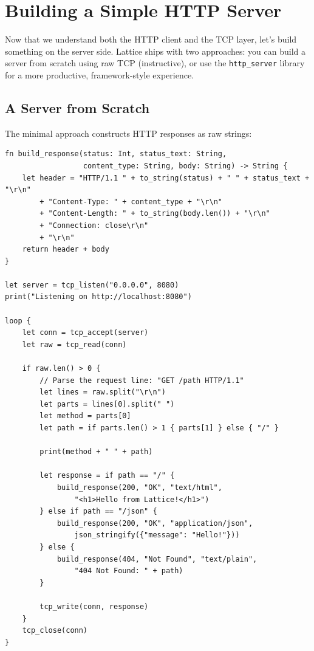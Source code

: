 \section{Building a Simple HTTP Server}\label{sec:http-server}


Now that we understand both the HTTP client and the TCP layer, let's build
something on the server side. Lattice ships with two approaches: you can
build a server from scratch using raw TCP (instructive), or use the
\texttt{http\_server} library for a more productive, framework-style
experience.

\subsection{A Server from Scratch}\label{sec:server-from-scratch}

The minimal approach constructs HTTP responses as raw strings:

\begin{lstlisting}[language=Lattice, caption={A minimal HTTP server from raw TCP}]
fn build_response(status: Int, status_text: String,
                  content_type: String, body: String) -> String {
    let header = "HTTP/1.1 " + to_string(status) + " " + status_text + "\r\n"
        + "Content-Type: " + content_type + "\r\n"
        + "Content-Length: " + to_string(body.len()) + "\r\n"
        + "Connection: close\r\n"
        + "\r\n"
    return header + body
}

let server = tcp_listen("0.0.0.0", 8080)
print("Listening on http://localhost:8080")

loop {
    let conn = tcp_accept(server)
    let raw = tcp_read(conn)

    if raw.len() > 0 {
        // Parse the request line: "GET /path HTTP/1.1"
        let lines = raw.split("\r\n")
        let parts = lines[0].split(" ")
        let method = parts[0]
        let path = if parts.len() > 1 { parts[1] } else { "/" }

        print(method + " " + path)

        let response = if path == "/" {
            build_response(200, "OK", "text/html",
                "<h1>Hello from Lattice!</h1>")
        } else if path == "/json" {
            build_response(200, "OK", "application/json",
                json_stringify({"message": "Hello!"}))
        } else {
            build_response(404, "Not Found", "text/plain",
                "404 Not Found: " + path)
        }

        tcp_write(conn, response)
    }
    tcp_close(conn)
}
\end{lstlisting}


